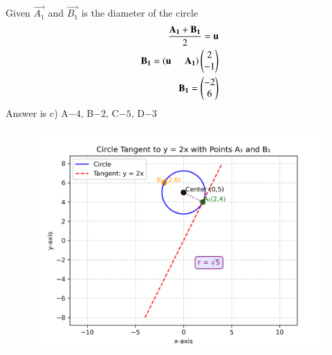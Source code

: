 \documentclass[journal]{IEEEtran}
\begin{document}
    Given  $\vec{A_1}$ and $\vec{B_1}$ is the diameter of the circle 
\begin{align}
    \frac{\mathbf{A_1}+\mathbf{B_1}}{2}=\mathbf{u}\\
    \mathbf{B_1}=\left(\mathbf{u} \hspace{0.5cm} \mathbf{A_1}\right)\begin{pmatrix}2\\-1\end{pmatrix}\\
    \mathbf{B_1}=\begin{pmatrix}-2\\6\end{pmatrix}
\end{align}
Answer is c) A$- 4$, B$- 2$, C$- 5$, D$- 3$
\begin{figure}[h!]
    \centering
    \includegraphics[width=0.8\columnwidth]{figs/01.png}
    \caption{}
    \label{fig:placeholder}
\end{figure}
\end{document}
